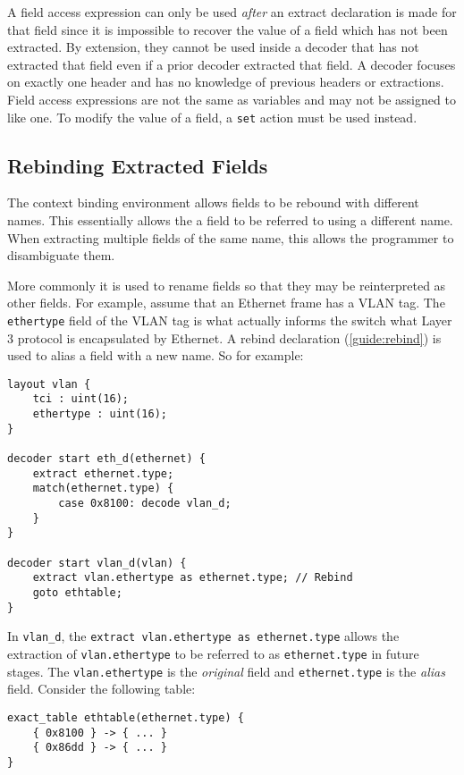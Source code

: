 A field access expression can only be used \textit{after} an extract declaration
is made for that field since it is impossible to recover the value of a
field which has not been extracted. By extension, they cannot be used inside a
decoder that has not extracted that field even if a prior decoder extracted that field. A decoder focuses on exactly one
header and has no knowledge of previous headers or extractions.
Field access expressions are not the same as variables and may not be assigned to like one. To modify the
value of a field, a \texttt{set} action must be used instead.

\subsection{Rebinding Extracted Fields}

The context binding environment
allows fields to be rebound with different names. This essentially
allows the a field to be referred to using a different name.
When extracting multiple fields of the same name, this allows the
programmer to disambiguate them. 

More commonly it is used to rename fields so that they may be reinterpreted as other fields. For example, assume that an Ethernet
frame has a VLAN tag. The \texttt{ethertype} field of the VLAN tag is what 
actually informs the switch what Layer 3 protocol is encapsulated
by Ethernet. 
A rebind declaration (\ref{guide:rebind}) is used to alias a field with a new name.
So for example:

\begin{lstlisting}
layout vlan {
	tci : uint(16);
	ethertype : uint(16);
}

decoder start eth_d(ethernet) {
	extract ethernet.type;
	match(ethernet.type) {
		case 0x8100: decode vlan_d;
	}
}

decoder start vlan_d(vlan) {
	extract vlan.ethertype as ethernet.type; // Rebind
	goto ethtable;
}
\end{lstlisting}

In \texttt{vlan\_d}, the \texttt{extract vlan.ethertype as ethernet.type} allows the extraction of \texttt{vlan.ethertype} to be referred to as
\texttt{ethernet.type} in future stages. The \texttt{vlan.ethertype}
is the \emph{original} field and \texttt{ethernet.type} is the \emph{alias} field.
Consider the following table:

\begin{lstlisting}
exact_table ethtable(ethernet.type) {
	{ 0x8100 } -> { ... }
	{ 0x86dd } -> { ... }
}
\end{lstlisting}


